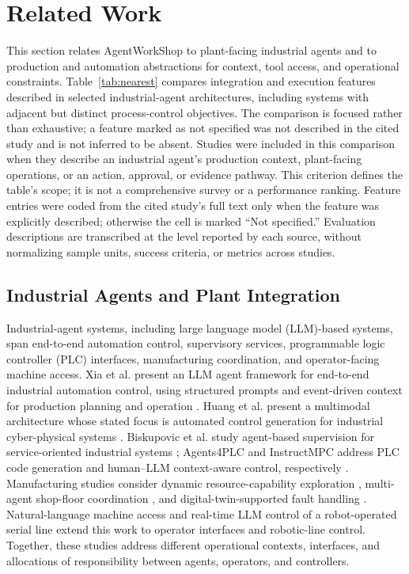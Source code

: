 \section{Related Work}
\label{sec:related}
This section relates AgentWorkShop to plant-facing industrial agents and to
production and automation abstractions for context, tool access, and
operational constraints. Table~\ref{tab:nearest} compares integration and
execution features described in selected industrial-agent architectures,
including systems with adjacent but distinct process-control objectives. The
comparison is focused rather than exhaustive; a feature marked as not
specified was not described in the cited study and is not inferred to be
absent.
Studies were included in this comparison when they describe an industrial
agent's production context, plant-facing operations, or an action, approval,
or evidence pathway. This criterion defines the table's scope; it is not a
comprehensive survey or a performance ranking.
Feature entries were coded from the cited study's full text only when the
feature was explicitly described; otherwise the cell is marked ``Not
specified.'' Evaluation descriptions are transcribed at the level reported
by each source, without normalizing sample units, success criteria, or
metrics across studies.

\subsection{Industrial Agents and Plant Integration}
Industrial-agent systems, including large language model (LLM)-based systems,
span end-to-end automation control, supervisory
services, programmable logic controller (PLC) interfaces, manufacturing
coordination, and operator-facing machine access. Xia et al. present an
LLM agent framework for end-to-end industrial automation control, using
structured prompts and event-driven context for production planning and
operation \cite{xia2025control}. Huang et al. present a multimodal
architecture whose stated focus is automated control generation for
industrial cyber-physical systems \cite{huang2026made}. Biskupovic et al.
study agent-based supervision for service-oriented industrial systems
\cite{biskupovic2025supervision};
Agents4PLC and InstructMPC address PLC code generation and human--LLM
context-aware control, respectively
\cite{liu2026agents4plc,wu2025instructmpc}. Manufacturing studies consider
dynamic resource-capability exploration \cite{lim2025llmenabled}, multi-agent
shop-floor coordination \cite{zhao2026shopfloor}, and digital-twin-supported
fault handling \cite{gill2025llmdt}. Natural-language machine access
\cite{hofmann2025nlc} and real-time LLM control of a robot-operated serial
line \cite{waseem2026pretrained} extend this work to operator interfaces and
robotic-line control. Together, these studies address different operational
contexts, interfaces, and allocations of responsibility between agents,
operators, and controllers.

